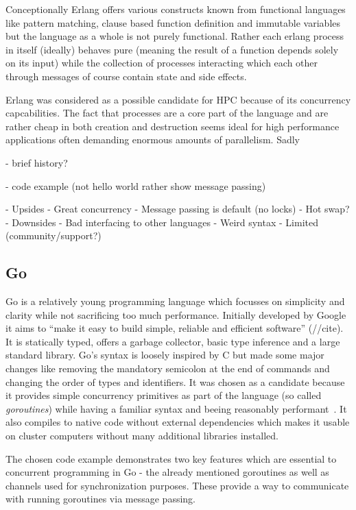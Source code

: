 Conceptionally Erlang offers various constructs known from functional languages like pattern matching, clause based function definition and immutable variables but the language as a whole is not purely functional. Rather each erlang process in itself (ideally) behaves pure (meaning the result of a function depends solely on its input) while the collection of processes interacting which each other through messages of course contain state and side effects.

Erlang was considered as a possible candidate for HPC because of its concurrency capcabilities. The fact that processes are a core part of the language and are rather cheap in both creation and destruction seems ideal for high performance applications often demanding enormous amounts of parallelism. Sadly

- brief history?

- code example (not hello world rather show message passing)

- Upsides
    - Great concurrency
    - Message passing is default (no locks)
    - Hot swap?
- Downsides
    - Bad interfacing to other languages
    - Weird syntax
    - Limited (community/support?)


\subsection*{Go}
\label{subsec:State_of_the_art::Candidates::Go}

Go is a relatively young programming language which focusses on simplicity and clarity while not sacrificing too much performance. Initially developed by Google it aims to ``make it easy to build simple, reliable and efficient software'' (//cite). It is statically typed, offers a garbage collector, basic type inference and a large standard library. Go's syntax is loosely inspired by C but made some major changes like removing the mandatory semicolon at the end of commands and changing the order of types and identifiers. It was chosen as a candidate because it provides simple concurrency primitives as part of the language (so called \textit{goroutines}) while having a familiar syntax and beeing reasonably performant~\cite{intro_go}. It also compiles to native code without external dependencies which makes it usable on cluster computers without many additional libraries installed.

The chosen code example demonstrates two key features which are essential to concurrent programming in Go - the already mentioned goroutines as well as channels used for synchronization purposes. These provide a way to communicate with running goroutines via message passing.
\\


